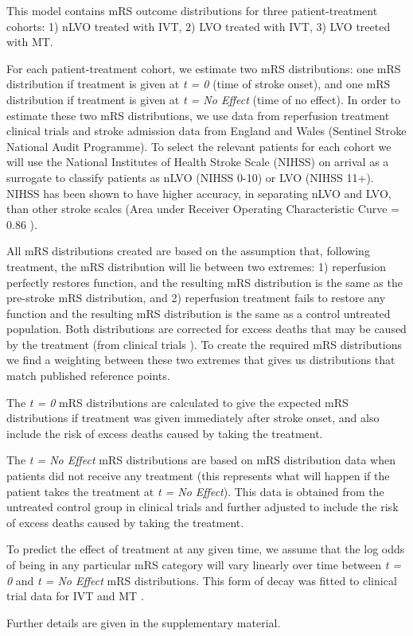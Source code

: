 This model contains mRS outcome distributions for three patient-treatment cohorts: 1) nLVO treated with IVT, 2) LVO treated with IVT, 3) LVO treeted with MT.

For each patient-treatment cohort, we estimate two mRS distributions: one mRS distribution if treatment is given at \emph{t = 0} (time of stroke onset), and one mRS distribution if treatment is given at \emph{t = No Effect} (time of no effect). In order to estimate these two mRS distributions, we use data from reperfusion treatment clinical trials \cite{lees_time_2010, emberson_effect_2014, goyal_endovascular_2016} and stroke admission data from England and Wales (Sentinel Stroke National Audit Programme). To select the relevant patients for each cohort we will use the National Institutes of Health Stroke Scale (NIHSS) on arrival as a surrogate to classify patients as nLVO (NIHSS 0-10) or LVO (NIHSS 11+). NIHSS has been shown to have higher accuracy, in separating nLVO and LVO, than other stroke scales (Area under Receiver Operating Characteristic Curve = 0.86 \cite{duvekot_comparison_2021}).

All mRS distributions created are based on the assumption that, following treatment, the mRS distribution will lie between two extremes: 1) reperfusion perfectly restores function, and the resulting mRS distribution is the same as the pre-stroke mRS distribution, and 2) reperfusion treatment fails to restore any function and the resulting mRS distribution is the same as a control untreated population. Both distributions are corrected for excess deaths that may be caused by the treatment (from clinical trials \cite{emberson_effect_2014, goyal_endovascular_2016}). To create the required mRS distributions we find a weighting between these two extremes that gives us distributions that match published reference points.

The \textit{t = 0} mRS distributions are calculated to give the expected mRS distributions if treatment was given immediately after stroke onset, and also include the risk of excess deaths caused by taking the treatment. 

The \textit{t = No Effect} mRS distributions are based on mRS distribution data when patients did not receive any treatment (this represents what will happen if the patient takes the treatment at \textit{t = No Effect}). This data is obtained from the untreated control group in clinical trials and further adjusted to include the risk of excess deaths caused by taking the treatment.

To predict the effect of treatment at any given time, we assume that the log odds of being in any particular mRS category will vary linearly over time between \textit{t = 0} and \textit{t = No Effect} mRS distributions. This form of decay was fitted to clinical trial data for IVT \cite{emberson_effect_2014} and MT \cite{fransen_time_2016}.

Further details are given in the supplementary material.



